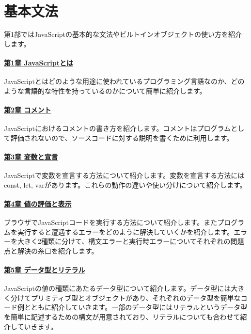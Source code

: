 \hypertarget{basic-grammar}{%
\part{基本文法}\label{basic-grammar}}

第1部ではJavaScriptの基本的な文法やビルトインオブジェクトの使い方を紹介します。

\subsection*{\hyperlink{what-is-javascript}{第1章 JavaScriptとは}}

JavaScriptとはどのような用途に使われているプログラミング言語なのか、どのような言語的な特性を持っているのかについて簡単に紹介します。

\subsection*{\hyperlink{comment}{第2章 コメント}}

JavaScriptにおけるコメントの書き方を紹介します。コメントはプログラムとして評価されないので、ソースコードに対する説明を書くために利用します。

\subsection*{\hyperlink{variable-and-declaration}{第3章 変数と宣言}}

JavaScriptで変数を宣言する方法について紹介します。変数を宣言する方法にはconst,
let, varがあります。これらの動作の違いや使い分けについて紹介します。

\subsection*{\hyperlink{read-eval-print}{第4章 値の評価と表示}}

ブラウザでJavaScriptコードを実行する方法について紹介します。またプログラムを実行すると遭遇するエラーをどのように解決していくかを紹介します。エラーを大きく2種類に分けて、構文エラーと実行時エラーについてそれぞれの問題点と解決の糸口を紹介します。

\subsection*{\hyperlink{data-type-and-literal}{第5章 データ型とリテラル}}

JavaScriptの値の種類にあたるデータ型について紹介します。データ型には大きく分けてプリミティブ型とオブジェクトがあり、それぞれのデータ型を簡単なコード例とともに紹介していきます。一部のデータ型にはリテラルというデータ型を簡単に記述するための構文が用意されており、リテラルについても合わせて紹介していきます。

